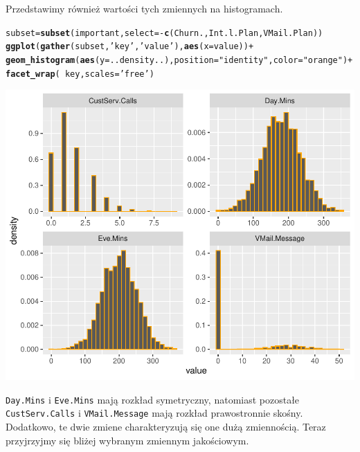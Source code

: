 \documentclass{article}\usepackage[]{graphicx}\usepackage[]{color}
\makeatletter
\def\maxwidth{ %
  \ifdim\Gin@nat@width>\linewidth
    \linewidth
  \else
    \Gin@nat@width
  \fi
}
\newcommand{\hlstr}[1]{\textcolor[rgb]{0.192,0.494,0.8}{#1}}%
\newcommand{\hlopt}[1]{\textcolor[rgb]{0,0,0}{#1}}%
\newcommand{\hlstd}[1]{\textcolor[rgb]{0.345,0.345,0.345}{#1}}%
\newcommand{\hlkwb}[1]{\textcolor[rgb]{0.69,0.353,0.396}{#1}}%
\newcommand{\hlkwc}[1]{\textcolor[rgb]{0.333,0.667,0.333}{#1}}%
\newcommand{\hlkwd}[1]{\textcolor[rgb]{0.737,0.353,0.396}{\textbf{#1}}}%
\newenvironment{kframe}{%
 \def\at@end@of@kframe{}%
 \ifinner\ifhmode%
  \def\at@end@of@kframe{\end{minipage}}%
  \begin{minipage}{\columnwidth}%
 \fi\fi%
 \def\FrameCommand##1{\hskip\@totalleftmargin \hskip-\fboxsep
 \colorbox{shadecolor}{##1}\hskip-\fboxsep
     \hskip-\linewidth \hskip-\@totalleftmargin \hskip\columnwidth}%
 \MakeFramed {\advance\hsize-\width
   \@totalleftmargin\z@ \linewidth\hsize
   \@setminipage}}%
 {\par\unskip\endMakeFramed%
 \at@end@of@kframe}
\newenvironment{knitrout}{}{} %
\makeatother
\begin{document}
Przedstawimy również wartości tych zmiennych na histogramach.

\begin{knitrout}
\color{fgcolor}\begin{kframe}
\begin{alltt}
\hlstd{subset} \hlkwb{=} \hlkwd{subset}\hlstd{(important,} \hlkwc{select}\hlstd{=}\hlopt{-}\hlkwd{c}\hlstd{(Churn., Int.l.Plan, VMail.Plan))}
\hlkwd{ggplot}\hlstd{(}\hlkwd{gather}\hlstd{(subset,} \hlstr{'key'}\hlstd{,} \hlstr{'value'}\hlstd{),} \hlkwd{aes}\hlstd{(}\hlkwc{x}\hlstd{=value))} \hlopt{+}
  \hlkwd{geom_histogram}\hlstd{(}\hlkwd{aes}\hlstd{(}\hlkwc{y}\hlstd{=..density..),} \hlkwc{position}\hlstd{=}\hlstr{"identity"}\hlstd{,} \hlkwc{color}\hlstd{=}\hlstr{"orange"}\hlstd{)} \hlopt{+}
  \hlkwd{facet_wrap}\hlstd{(}\hlopt{~}\hlstd{key,} \hlkwc{scales}\hlstd{=}\hlstr{'free'}\hlstd{)}
\end{alltt}
\end{kframe}

{\centering \includegraphics[width=\maxwidth]{figure/Histogramy-1} 

}



\end{knitrout}


\verb|Day.Mins| i \verb|Eve.Mins| mają rozkład symetryczny, natomiast pozostałe \verb|CustServ.Calls| i \verb|VMail.Message| mają rozkład prawostronnie skośny. Dodatkowo, te dwie zmiene charakteryzują się one dużą zmiennością.\newline
\vspace{0.3cm}
Teraz przyjrzyjmy się bliżej wybranym zmiennym jakościowym.
\end{document}
